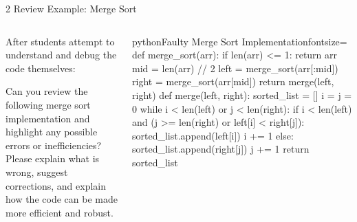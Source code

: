 \documentclass[xcolor=dvipsnames, aspectratio=169]{beamer}
\begin{document}
\begin{frame}[fragile]{2 Review Example: Merge Sort}
  \begin{columns}[T]
    \begin{column}{0.42\textwidth}
      After students attempt to understand and debug the code themselves:
      \begin{promptbox}
Can you review the following merge sort implementation and highlight any possible errors or inefficiencies? Please explain what is wrong, suggest corrections, and explain how the code can be made more efficient and robust.
      \end{promptbox}
    \end{column}
    
    \begin{column}{0.52\textwidth}
      \vspace{-1.5em}
      \begin{codeboxtc}{python}{Faulty Merge Sort Implementation}{}{fontsize=\scriptsize}
    def merge_sort(arr):
        if len(arr) <= 1:
            return arr
        mid = len(arr) // 2
        left = merge_sort(arr[:mid])
        right = merge_sort(arr[mid]) 
        return merge(left, right)
    def merge(left, right):
        sorted_list = []
        i = j = 0
        while i < len(left) or j < len(right):          
            if i < len(left) and (j >= len(right) or left[i] < right[j]):
                sorted_list.append(left[i])
                i += 1
            else:
                sorted_list.append(right[j])
                j += 1
        return sorted_list\end{codeboxtc}
    \end{column}
  \end{columns}
\end{frame}
\end{document}
